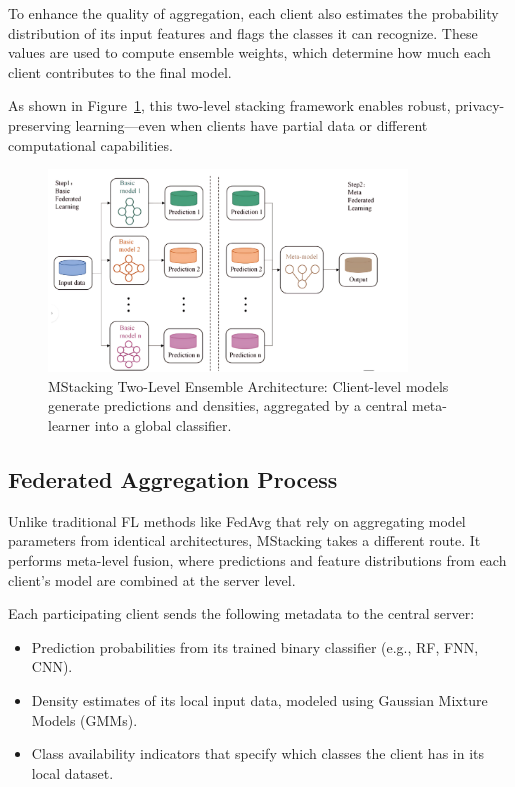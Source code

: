 To enhance the quality of aggregation, each client also estimates the probability distribution of its input features and flags the classes it can recognize. These values are used to compute ensemble weights, which determine how much each client contributes to the final model.

As shown in Figure~\ref{fig:stacking_strategy}, this two-level stacking framework enables robust, privacy-preserving learning—even when clients have partial data or different computational capabilities.

\begin{figure}[h]
    \centering
    \includegraphics[width=0.85\textwidth]{./Figures/fig4.png}
    \caption{MStacking Two-Level Ensemble Architecture: Client-level models generate predictions and densities, aggregated by a central meta-learner into a global classifier.}
    \label{fig:stacking_strategy}
\end{figure}

\subsection{Federated Aggregation Process}
\label{sec:federated_aggregation}

Unlike traditional FL methods like FedAvg that rely on aggregating model parameters from identical architectures, MStacking takes a different route. It performs meta-level fusion, where predictions and feature distributions from each client’s model are combined at the server level.

Each participating client sends the following metadata to the central server:
\begin{itemize}
    \item Prediction probabilities from its trained binary classifier (e.g., RF, FNN, CNN).
    \item Density estimates of its local input data, modeled using Gaussian Mixture Models (GMMs).
    \item Class availability indicators that specify which classes the client has in its local dataset.
\end{itemize}

